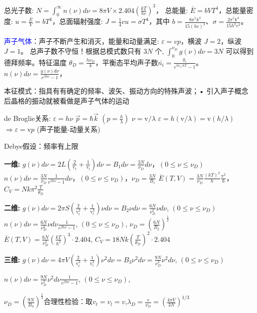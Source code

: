 \documentclass[a4paper,8pt]{extarticle} %
\newcommand{\bluetext}[1]{\textcolor{blue}{#1}}
\begin{document}
\begin{multicols}{3}
总光子数: $N=\int_0^{\infty}n(\nu)d\nu=8\pi V \times 2.404\left(\frac{kT}{hc}\right)^3$，
总能量: $\bar{E} = bVT^4$，总能量密度: $u = \frac{\bar{E}}{V} = bT^4$，总面辐射强度: $J = \frac{1}{4}cu = \sigma T^4$，其中 $b = \frac{8\pi^5k^4}{15(hc)^3}$、$\sigma = \frac{2\pi^5k^4}{15h^3c^2}$。


\bluetext{声子气体}：声子不断产生和消灭，能量和动量满足: $\varepsilon = vp$，横波 $J = 2$，纵波 $J = 1$。
总声子数不守恒！根据总模式数只有 $3N$ 个, $\int_0^{\nu_D} g(\nu)d\nu = 3N$ 可以得到德拜频率。特征温度 $\theta_D = \frac{h\nu_D}{k}$，平衡态平均声子数$\bar{n_i} = \frac{g_i}{e^{h\nu_i/kT}-1}$。$n(\nu)d\nu = \frac{g(\nu)d\nu}{e^{\beta h\nu}-1}$，

本征模式：指具有有确定的频率、波矢、振动方向的特殊声波；• 引入声子概念后晶格的振动就被看做是声子气体的运动

de Broglie关系:
$\varepsilon = h\nu$
$\vec{p} = \hbar\vec{k}$ $(p = \frac{h}{\lambda})$
$\nu = \mathrm{v}/\lambda$
$\varepsilon = h(\mathrm{v}/\lambda) = \mathrm{v}(h/\lambda)$
$\Rightarrow \varepsilon = \mathrm{v}p$ (声子能量-动量关系)

Debye假设：频率有上限

\textbf{一维:}
$g(\nu)d\nu = 2L(\frac{2}{\mathrm{v_t}} + \frac{1}{\mathrm{v_l}})d\nu = B_1d\nu = \frac{3N}{\nu_D}d\nu$，$(0 \leq \nu \leq \nu_D)$
$n(\nu)d\nu = \frac{3N}{\nu_D}\frac{1}{e^{\beta h\nu}-1}d\nu$，$(0 \leq \nu \leq \nu_D)$，$\nu_D = \frac{3N}{B_1}$
$\overline{E}(T,V) = \frac{3N}{\nu_D}\frac{(kT)^2}{h}\frac{\pi^2}{6}$，$C_V = Nk\pi^2\frac{T}{\theta_D}$

\textbf{二维:}
$g(\nu)d\nu = 2\pi S(\frac{2}{\mathrm{v}_t^2} + \frac{1}{\mathrm{v}_l^2})\nu d\nu = B_2\nu d\nu = \frac{6N}{\nu_D^2}\nu d\nu$, $(0 \leq \nu \leq \nu_D)$
$n(\nu)d\nu = \frac{6N}{\nu_D^2}\nu d\nu\frac{1}{e^{\beta h\nu}-1}$, $(0 \leq \nu \leq \nu_D)$, $\nu_D = (\frac{6N}{B_2})^{\frac{1}{2}}$
$\overline{E}(T,V) = \frac{6N}{\nu_D^2}(\frac{kT}{h^2})^3\cdot2.404$, $C_V = 18Nk(\frac{T}{\theta_D})^2\cdot2.404$

\textbf{三维:}
$g(\nu)d\nu = 4\pi V(\frac{2}{\mathrm{v}_t^3} + \frac{1}{\mathrm{v}_l^3})\nu^2d\nu = B_3\nu^2d\nu = \frac{9N}{\nu_D^3}\nu^2d\nu$, $(0 \leq \nu \leq \nu_D)$

$n(\nu)d\nu = \frac{9N}{\nu_D^3}\nu^2d\nu\frac{1}{e^{\beta h\nu}-1}$, $(0 \leq \nu \leq \nu_D)$, 

$\nu_D = (\frac{9N}{B_3})^{\frac{1}{3}}$合理性检验：取$v_t=v_l=v$,$\lambda_D = \frac{v}{\nu_D}=(\frac{4\pi V}{3N})^{1/3}$


\end{multicols}
\end{document}
